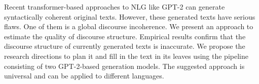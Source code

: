 Recent transformer-based approaches to NLG like GPT-2 can generate syntactically coherent original texts. However, these generated texts have serious flaws. One of them is a global discourse incoherence. We present an approach to estimate the quality of discourse structure. Empirical results confirm that the discourse structure of currently generated texts is inaccurate. We propose the research directions to plan it and fill in the text in its leaves using the pipeline consisting of two GPT-2-based generation models. The suggested approach is universal and can be applied to different languages.
